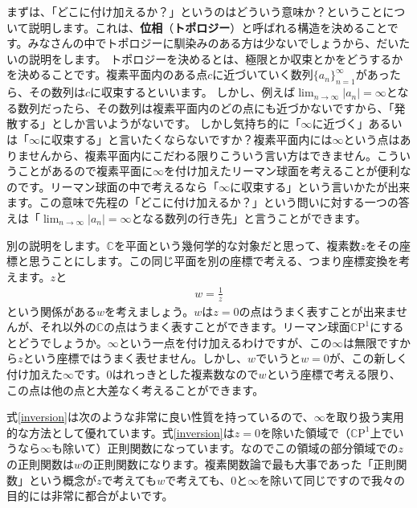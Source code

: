 \documentclass[report,paper=a4, fontsize=12pt, line_length=16cm, number_of_lines=33,dvipdfmx]{jlreq}
\numberwithin{equation}{section}
\newcommand{\Cb}{\mathbb{C}}
\newcommand{\CP}{\Cb \mathrm{P}}
\newcommand{\strong}[1]{\textsf{\bfseries #1}}
\begin{document}
まずは、「どこに付け加えるか？」というのはどういう意味か？ということについて説明します。これは、\strong{位相}（\strong{トポロジー}）と呼ばれる構造を決めることです。みなさんの中でトポロジーに馴染みのある方は少ないでしょうから、だいたいの説明をします。
トポロジーを決めるとは、極限とか収束とかをどうするかを決めることです。複素平面内のある点$c$に近づいていく数列$\{a_n\}_{n=1}^{\infty}$があったら、その数列は$c$に収束するといいます。
しかし、例えば$\lim_{n\to \infty}|a_n|=\infty$となる数列だったら、その数列は複素平面内のどの点にも近づかないですから、「発散する」としか言いようがないです。
しかし気持ち的に「$\infty$に近づく」あるいは「$\infty$に収束する」と言いたくならないですか？複素平面内には$\infty$という点はありませんから、複素平面内にこだわる限りこういう言い方はできません。こういうことがあるので複素平面に$\infty$を付け加えたリーマン球面を考えることが便利なのです。リーマン球面の中で考えるなら「$\infty$に収束する」という言いかたが出来ます。この意味で先程の「どこに付け加えるか？」という問いに対する一つの答えは「$\lim_{n\to\infty}|a_n|=\infty$となる数列の行き先」と言うことができます。

別の説明をします。$\Cb$を平面という幾何学的な対象だと思って、複素数$z$をその座標と思うことにします。この同じ平面を別の座標で考える、つまり座標変換を考えます。$z$と
\begin{align}
  w=\frac{1}{z}\label{inversion}
\end{align}
という関係がある$w$を考えましょう。$w$は$z=0$の点はうまく表すことが出来ませんが、それ以外の$\Cb$の点はうまく表すことができます。リーマン球面$\CP^1$にするとどうでしょうか。$\infty$という一点を付け加えるわけですが、この$\infty$は無限ですから$z$という座標ではうまく表せません。しかし、$w$でいうと$w=0$が、この新しく付け加えた$\infty$です。$0$はれっきとした複素数なので$w$という座標で考える限り、この点は他の点と大差なく考えることができます。

式\eqref{inversion}は次のような非常に良い性質を持っているので、$\infty$を取り扱う実用的な方法として優れています。式\eqref{inversion}は$z=0$を除いた領域で（$\CP^1$上でいうなら$\infty$も除いて）正則関数になっています。なのでこの領域の部分領域での$z$の正則関数は$w$の正則関数になります。複素関数論で最も大事であった「正則関数」という概念が$z$で考えても$w$で考えても、$0$と$\infty$を除いて同じですので我々の目的には非常に都合がよいです。
\end{document}

